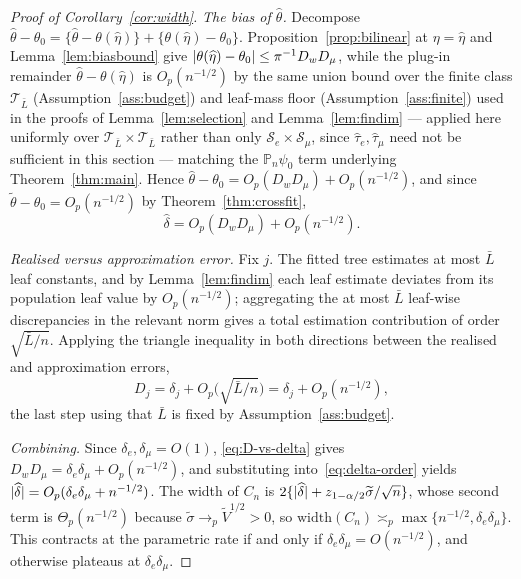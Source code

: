 \documentclass[11pt]{article}
\theoremstyle{plain}
\theoremstyle{definition}
\theoremstyle{remark}
\newcommand{\Pn}{\mathbb{P}_n}
\newcommand{\cT}{\mathcal{T}}
\newcommand{\cS}{\mathcal{S}}
\newcommand{\that}{\widehat{\tau}}
\newcommand{\thetahat}{\widehat{\theta}}
\newcommand{\thetatil}{\widetilde{\theta}}
\newcommand{\Dw}{D_w}
\newcommand{\Dm}{D_\mu}
\DeclarePairedDelimiter{\abs}{\lvert}{\rvert}
\begin{document}
\begin{proof}[Proof of Corollary~\ref{cor:width}]
\emph{The bias of $\thetahat$.} Decompose
$\thetahat-\theta_0=\{\thetahat-\theta(\widehat\eta)\}
+\{\theta(\widehat\eta)-\theta_0\}$. Proposition~\ref{prop:bilinear} at
$\eta=\widehat\eta$ and Lemma~\ref{lem:biasbound} give
$\abs{\theta(\widehat\eta)-\theta_0}\le\pi^{-1}\Dw\Dm$, while the plug-in
remainder $\thetahat-\theta(\widehat\eta)$ is $O_p(n^{-1/2})$ by the same
union bound over the finite class $\cT_{\bar L}$ (Assumption~\ref{ass:budget})
and leaf-mass floor (Assumption~\ref{ass:finite}) used in the proofs of
Lemma~\ref{lem:selection} and Lemma~\ref{lem:findim} --- applied here
uniformly over $\cT_{\bar L}\times\cT_{\bar L}$ rather than only
$\cS_e\times\cS_\mu$, since $\that_e,\that_\mu$ need not be sufficient in
this section --- matching the $\Pn\psi_0$ term underlying Theorem~\ref{thm:main}. Hence
$\thetahat-\theta_0=O_p(\Dw\Dm)+O_p(n^{-1/2})$, and since
$\thetatil-\theta_0=O_p(n^{-1/2})$ by Theorem~\ref{thm:crossfit},
\begin{equation}\label{eq:delta-order}
  \widehat\delta=O_p(\Dw\Dm)+O_p(n^{-1/2}).
\end{equation}

\emph{Realised versus approximation error.} Fix $j$. The fitted tree estimates at
most $\bar L$ leaf constants, and by Lemma~\ref{lem:findim} each leaf estimate
deviates from its population leaf value by $O_p(n^{-1/2})$; aggregating the at
most $\bar L$ leaf-wise discrepancies in the relevant norm gives a total
estimation contribution of order $\sqrt{\bar L/n}$. Applying the triangle
inequality in both directions between the realised and approximation errors,
\begin{equation}\label{eq:D-vs-delta}
  D_j=\delta_j+O_p\bigl(\sqrt{\bar L/n}\bigr)=\delta_j+O_p(n^{-1/2}),
\end{equation}
the last step using that $\bar L$ is fixed by Assumption~\ref{ass:budget}.

\emph{Combining.} Since $\delta_e,\delta_\mu=O(1)$, \eqref{eq:D-vs-delta} gives
$\Dw\Dm=\delta_e\delta_\mu+O_p(n^{-1/2})$, and substituting
into~\eqref{eq:delta-order} yields
$\abs{\widehat\delta}=O_p(\delta_e\delta_\mu+n^{-1/2})$. The width of $C_n$ is
$2\{\abs{\widehat\delta}+z_{1-\alpha/2}\widetilde\sigma/\sqrt n\}$, whose second
term is $\Theta_p(n^{-1/2})$ because $\widetilde\sigma\to_p\widetilde V^{1/2}>0$,
so $\mathrm{width}(C_n)\asymp_p\max\{n^{-1/2},\delta_e\delta_\mu\}$. This
contracts at the parametric rate if and only if
$\delta_e\delta_\mu=O(n^{-1/2})$, and otherwise plateaus at
$\delta_e\delta_\mu$.
\end{proof}
\end{document}
